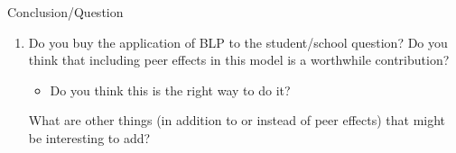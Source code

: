 \documentclass[dvipsnames]{beamer}
\begin{document}
%
\begin{frame}{Conclusion/Question}
  \begin{enumerate}
  \item Do you buy the application of BLP to the student/school question?
    \vitem Do you think that including peer effects in this model is a worthwhile contribution?
    \begin{itemize}
    \item Do you think this is the right way to do it?
    \end{itemize}
    \vitem What are other things (in addition to or instead of peer effects) that might be interesting to add?
  \end{enumerate}
\end{frame}
\end{document}
